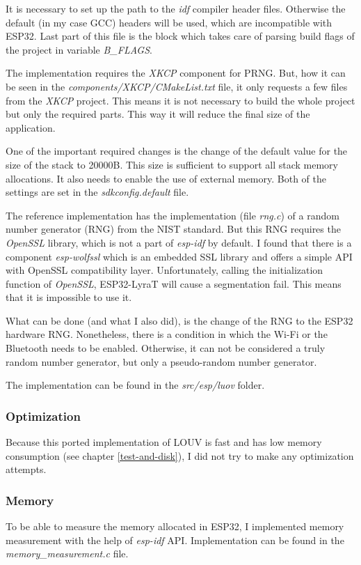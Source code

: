 \documentclass[thesis=M,english]{FITthesis}[2019/12/23]
\begin{document}
\noindent
It is necessary to set up the path to the \textit{idf} compiler header files. Otherwise the default (in my case GCC) headers will be used, which are incompatible with ESP32. Last part of this file is the block which takes care of parsing build flags of the project in variable \textit{B\_FLAGS}.

\bigskip
\noindent
The implementation requires the \textit{XKCP} component for PRNG. But, how it can be seen in the \textit{components/XKCP/CMakeList.txt} file, it only requests a few files from the \textit{XKCP} project. This means it is not necessary to build the whole project but only the required parts. This way it will reduce the final size of the application.

\bigskip
\noindent
One of the important required changes is the change of the default value for the size of the stack to 20000B. This size is sufficient to support all stack memory allocations. It also needs to enable the use of external memory. Both of the settings are set in the \textit{sdkconfig.default} file.

\bigskip
\noindent
The reference implementation has the implementation (file \textit{rng.c}) of a random number generator (RNG) from the NIST standard. But this RNG requires the \textit{OpenSSL} library, which is not a part of \textit{esp-idf} by default. I found that there is a component \textit{esp-wolfssl} which is an embedded SSL library and offers a simple API with OpenSSL compatibility layer. Unfortunately, calling the initialization function of \textit{OpenSSL}, ESP32-LyraT will cause a segmentation fail. This means that it is impossible to use it. 

\bigskip
\noindent
What can be done (and what I also did), is the change of the RNG to the ESP32 hardware RNG. Nonetheless, there is a condition in which the Wi-Fi or the Bluetooth needs to be enabled. Otherwise, it can not be considered a truly random number generator, but only a pseudo-random number generator.

\bigskip
\noindent
The implementation can be found in the \textit{src/esp/luov} folder.

\subsubsection{Optimization}
Because this ported implementation of LOUV is fast and has low memory consumption (see chapter \ref{test-and-disk}), I did not try to make any optimization attempts.

\subsubsection{Memory} \label{esp-luov-memory}
To be able to measure the memory allocated in ESP32, I implemented memory measurement with the help of \textit{esp-idf} API. Implementation can be found in the \textit{memory\_measurement.c} file.
\end{document}
